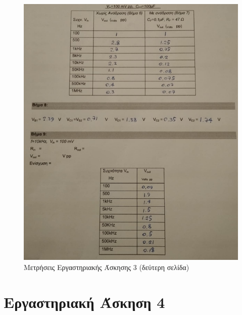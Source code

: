 \documentclass[11pt,a4paper,twoside,onecolumn,openright,final]{memoir}
\begin{document}
\begin{figure}[h]
\centerfloat%
\includegraphics[width=15.0cm]{figures/exercise3experiment2.png}
\caption{Μετρήσεις Εργαστηριακής Άσκησης 3 (δεύτερη σελίδα)}\label{fig:ex3experiment2}
\end{figure}

\chapter{Εργαστηριακή Άσκηση 4}
\end{document}
